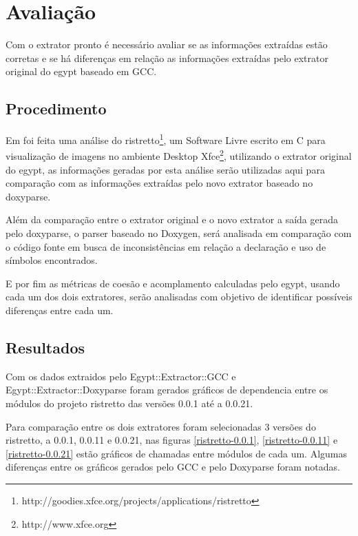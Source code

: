 \chapter{Avaliação} \label{ch:avaliacao}

Com o extrator pronto é necessário avaliar se as informações extraídas estão
corretas e se há diferenças em relação as informações extraídas pelo extrator
original do egypt baseado em GCC.

\section{Procedimento}

Em \cite{structuralComplexityEvolution} foi feita uma análise do
ristretto\footnote{http://goodies.xfce.org/projects/applications/ristretto}, um
Software Livre escrito em C para visualização de imagens no ambiente Desktop
Xfce\footnote{http://www.xfce.org}, utilizando o extrator original do egypt, as
informações geradas por esta análise serão utilizadas aqui para comparação com
as informações extraídas pelo novo extrator baseado no doxyparse.

Além da comparação entre o extrator original e o novo extrator a saída
gerada pelo doxyparse, o parser baseado no Doxygen, será analisada em
comparação com o código fonte em busca de inconsistências em relação a
declaração e uso de símbolos encontrados.

E por fim as métricas de coesão e acomplamento calculadas pelo egypt, usando
cada um dos dois extratores, serão analisadas com objetivo de identificar
possíveis diferenças entre cada um.

\section{Resultados}

Com os dados extraidos pelo Egypt::Extractor::GCC e Egypt::Extractor::Doxyparse
foram gerados gráficos de dependencia entre os módulos do projeto ristretto das
versões 0.0.1 até a 0.0.21.

Para comparação entre os dois extratores foram selecionadas 3 versões do
ristretto, a 0.0.1, 0.0.11 e 0.0.21, nas figuras \ref{ristretto-0.0.1},
\ref{ristretto-0.0.11} e \ref{ristretto-0.0.21} estão gráficos de chamadas
entre módulos de cada um. Algumas diferenças entre os gráficos
gerados pelo GCC e pelo Doxyparse foram notadas. 

